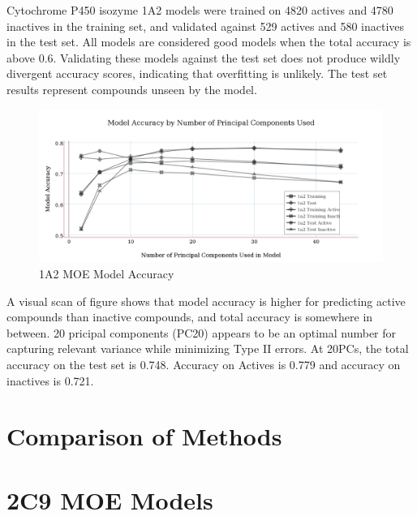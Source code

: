 Cytochrome P450 isozyme 1A2 models were trained on 4820 actives and 4780 inactives in the training set, and validated against 529 actives and 580 inactives in the test set. All models are considered good models when the total accuracy is above 0.6. Validating these models against the test set does not produce wildly divergent accuracy scores, indicating that overfitting is unlikely. The test set results represent compounds unseen by the model. 

\begin{figure}[!htbp]
\includegraphics[width=1\textwidth]{../img/1a2_moe_model_accuracy.png}
\caption{1A2 MOE Model Accuracy}
\end{figure}

A visual scan of figure shows that model accuracy is higher for predicting active compounds than inactive compounds, and total accuracy is somewhere in between. 20 pricipal components (PC20) appears to be an optimal number for capturing relevant variance while minimizing Type II errors. At 20PCs, the total accuracy on the test set is 0.748. Accuracy on Actives is 0.779 and accuracy on inactives is 0.721.
\section{Comparison of Methods}

\section{2C9 MOE Models}

